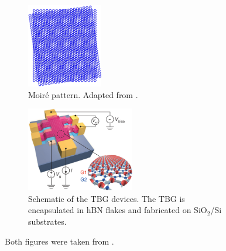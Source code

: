 \begin{figure}[H]
\centering
\begin{subfigure}{.37\textwidth}
  \centering
  \includegraphics[height=10em]{fig/moire_pattern.png}
  \caption{Moiré pattern. Adapted from \cite{moire_pattern_figure2021}.}
  \label{fig:moire_pattern}
\end{subfigure} \hfill
\begin{subfigure}{.60\textwidth}
  \centering
  \includegraphics[height=10em]{fig/tbg_device2.png}
  \caption{Schematic of the TBG devices. The TBG is encapsulated in hBN flakes and fabricated on SiO$_2$/Si substrates.}
  \label{fig:tbg_device2}
\end{subfigure}
\caption{Both figures were taken from \cite{cao2018_correlated}.}
\label{fig:tbg_moire_device}
\end{figure}

